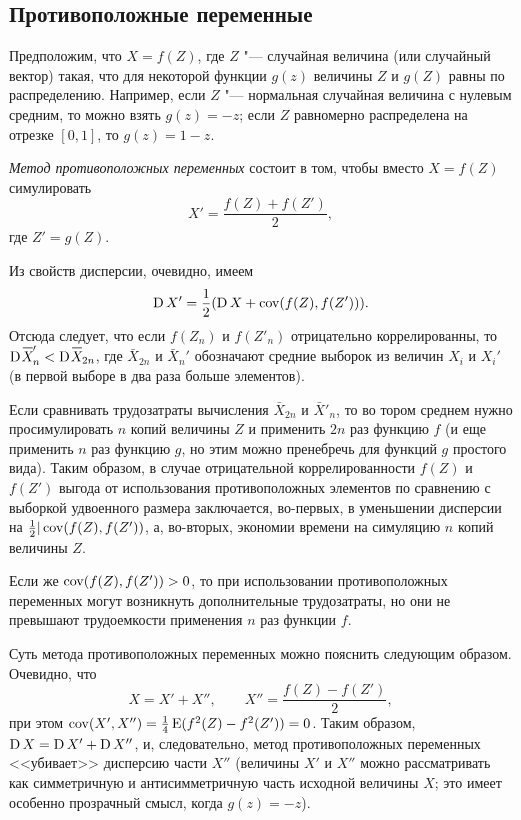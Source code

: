 \subsection{Противоположные переменные}
Предположим, что $X=f(Z)$, где $Z$ "--- случайная величина (или случайный  вектор) такая, что для некоторой функции $g(z)$ величины $Z$ и $g(Z)$ равны по распределению.
Например, если $Z$ "--- нормальная случайная величина с нулевым средним, то можно взять $g(z) = -z$; если $Z$ равномерно распределена на отрезке $[0,1]$, то $g(z) = 1-z$.

\emph{Метод противоположных переменных} состоит в том, чтобы вместо $X = f(Z)$
симулировать
\[
X' = \frac{f(Z) + f(Z')}{2},
\]
где $Z' = g(Z)$.

Из свойств дисперсии, очевидно, имеем
\[
\operatorname{D} X' = \frac12 (\operatorname{D} X + \operatorname{cov}(f(Z), f(Z'))).
\]
Отсюда следует, что если $f(Z_n)$ и $f(Z'_n)$ отрицательно коррелированны, то $\D \bar X_n' < \D \bar X_{2n}$, где $\bar X_{2n}$ и $\bar X_n'$ обозначают средние выборок из величин $X_i$ и $X_i'$ (в первой выборе в два раза больше элементов). 

Если сравнивать трудозатраты вычисления $\bar X_{2n}$ и $\bar X'_n$, то во тором среднем нужно просимулировать $n$ копий величины $Z$ и применить $2n$ раз функцию $f$ (и еще применить $n$ раз функцию $g$, но этим можно пренебречь для функций $g$ простого вида).
Таким образом, в случае отрицательной коррелированности $f(Z)$ и $f(Z')$ выгода от использования противоположных элементов  по сравнению с выборкой удвоенного размера заключается, во-первых, в уменьшении дисперсии на $\frac12 |\operatorname{cov}(f(Z), f(Z'))$, а, во-вторых, экономии времени на симуляцию $n$ копий величины $Z$.

Если же $\operatorname{cov}(f(Z), f(Z')) > 0$, то при использовании противоположных переменных могут возникнуть дополнительные трудозатраты, но они не превышают трудоемкости применения $n$ раз функции $f$. 

\begin{remark}
Суть метода противоположных переменных можно пояснить следующим образом. 
Очевидно, что
\[
X = X' + X'', \qquad X'' = \frac{f(Z) - f(Z')}{2},
\]
при этом $\operatorname{cov}(X', X'') = \frac14 \operatorname{E}(f^2(Z) - f^2(Z')) = 0$.
Таким образом, $\operatorname{D} X = \operatorname{D} X' + \operatorname{D} X''$, и, следовательно, метод противоположных переменных <<убивает>> дисперсию части $X''$ (величины $X'$ и $X''$ можно рассматривать как симметричную и антисимметричную часть исходной величины $X$; это имеет особенно прозрачный смысл, когда $g(z) = -z$).
\end{remark}



